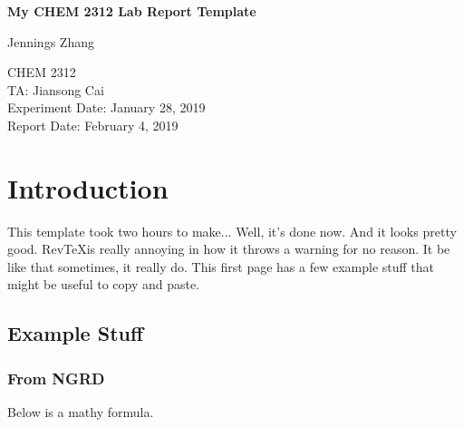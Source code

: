\documentclass[letterpaper,amsmath,amssymb,prb,preprint,12pt]{revtex4-1}%
\begin{document}
\setcounter{page}{0}
\raggedbottom


\begin{titlepage}
\begin{center}

\vspace*{6cm}
\Large
\textbf{My CHEM 2312 Lab Report Template}

\vspace{0.5cm}
\large
Jennings Zhang
\vspace{1.5cm}

CHEM 2312\\
TA: Jiansong Cai\\
Experiment Date: January 28, 2019\\
Report Date: February 4, 2019

\end{center}
\thispagestyle{empty} %
\end{titlepage}


\section{Introduction}

This template took two hours to make... Well, it's done now. And it looks pretty good. Rev\TeX is really annoying in how it throws a warning for no reason. It be like that sometimes, it really do. This first page has a few example stuff that might be useful to copy and paste.

\subsection{Example Stuff}

\subsubsection{From NGRD}

\setlength{\parskip}{8pt} %

Below is a mathy formula.
\end{document}
